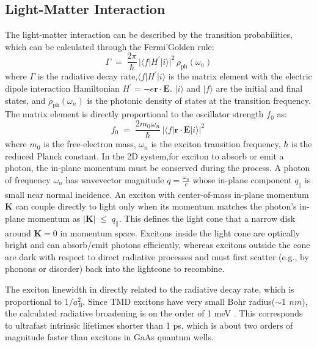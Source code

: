 \subsection{Light-Matter Interaction}
The light-matter interaction can be described by the transition probabilities, which can be calculated through the Fermi'Golden rule\cite{Fox2010-ly}:
\begin{equation}
\Gamma \;=\; \frac{2\pi}{\hbar}\, \big|\langle f \vert H^{\prime} \vert i \rangle\big|^2 \,
\rho_{\mathrm{ph}}(\omega_n)
\label{eq:fermi_golden_rule}
\end{equation}
where $\Gamma$ is the radiative decay rate,$\langle f \vert H^{\prime} \vert i \rangle$ is the matrix element with the electric dipole interaction Hamiltonian $H^{\prime} = -e \mathbf{r} \cdot \mathbf{E}$.
$\lvert i\rangle$ and $\lvert f\rangle$ are the initial and final states, and $\rho_{\mathrm{ph}}(\omega_n)$ is the photonic density of states at the transition frequency. The matrix element is directly proportional to the oscillator strength $f_0$ as\cite{Fox2010-ly}:
\begin{equation}
f_0 \;=\; \frac{2 m_0 \omega_n}{\hbar}\,\big|\langle f \vert \mathbf{r}\cdot\mathbf{E} \vert i \rangle\big|^2 \
\label{eq:oscillator_strength}
\end{equation}
where $m_0$ is the free-electron mass, $\omega_n$ is the exciton transition frequency, $\hbar$ is the reduced Planck constant. 
In the 2D system,for exciton to absorb or emit a photon, the in-plane momentum must be conserved during the process.
A photon of frequency $\omega_n$ has wavevector magnitude
$q =\frac{\omega_n}{c}$ whose in-plane component $q_{\parallel}$ is small near normal incidence. 
An exciton with center-of-mass in-plane momentum $\mathbf K$ can couple directly to light only when its momentum matches the photon's in-plane momentum as $|\mathbf K| \;\le\; q_{\parallel}$.
This defines the light cone that a narrow disk around
$\mathbf K\!=\!0$ in momentum space\cite{Wang2018-my}. 
Excitons inside the light cone are optically bright and can absorb/emit photons efficiently, whereas excitons outside the cone are dark with respect to direct radiative processes and must first scatter (e.g., by phonons or disorder) back into the lightcone to recombine\cite{Paik2024-ip}.

The exciton linewidth in directly related to the radiative decay rate, which is proportional to $1 / a_B^2$\cite{Wang2018-my}. Since TMD excitons have very small Bohr radius($\sim 1\,\ nm$), the calculated radiative broadening is on the order of 1 meV \cite{Glazov2015-us,Glazov2014-qz}.
This corresponds to ultrafast intrinsic lifetimes shorter than 1 ps\cite{Moody2015-iz,Robert2018-lt}, which is about two orders of magnitude faster than excitons in GaAs quantum wells\cite{Deveaud1991-yo}. 

